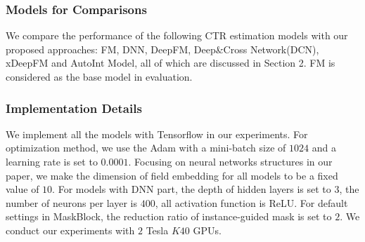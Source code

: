 \documentclass[sigconf]{acmart}
\begin{document}
\subsubsection{Models for Comparisons}
We compare the performance of the following CTR estimation models with our proposed approaches: FM, DNN, DeepFM, Deep\&Cross Network(DCN), xDeepFM and AutoInt Model, all of which are discussed in Section 2. FM is considered as the base model in evaluation.



\subsubsection{Implementation Details}


We implement all the models with Tensorflow in our experiments. For optimization method, we use the Adam with a mini-batch size of $1024$ and a learning rate is set to $0.0001$.  Focusing on neural networks structures in our paper, we make the dimension of field embedding for all models to be a fixed value of $10$. For models with DNN part, the depth of hidden layers is set to $3$, the number of neurons per layer is $400$, all activation function is ReLU. For default settings in MaskBlock, the reduction ratio of  instance-guided mask is set to $2$. We conduct our experiments with $2$ Tesla $K40$ GPUs.
\end{document}
